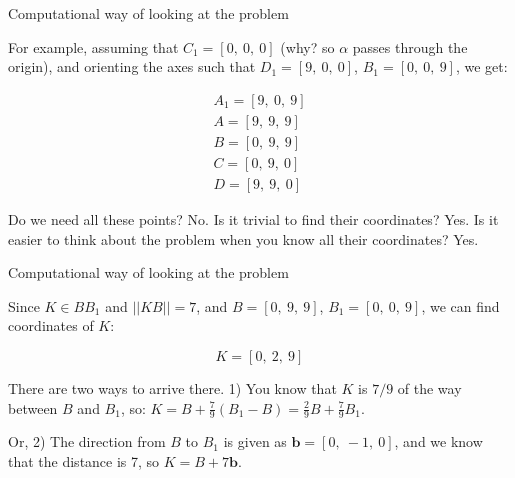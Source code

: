 \documentclass{beamer}
\begin{document}
\begin{frame}{Computational way of looking at the problem}
	\begin{flushleft}
		
		
		For example, assuming that $C_1 = [0, \ 0,  \ 0]$ (why? so $\alpha$ passes through the origin), and orienting the axes such that $D_1 = [9, \ 0,  \ 0]$, $B_1 = [0, \ 0,  \ 9]$, we get:
		
		\begin{align}
		A_1 = [9, \ 0,  \ 9] \\
		A = [9, \ 9,  \ 9] \\
		B = [0, \ 9,  \ 9] \\
		C = [0, \ 9,  \ 0] \\
		D = [9, \ 9,  \ 0]
		\end{align}
	
Do we need all these points? No. Is it trivial to find their coordinates? Yes. Is it easier to think about the problem when you know all their coordinates? Yes.	
		
	\end{flushleft}
\end{frame}



\begin{frame}{Computational way of looking at the problem}
	\begin{flushleft}
		
		Since  $K \in BB_1$ and $||KB|| = 7$, and $B = [0, \ 9,  \ 9]$, $B_1 = [0, \ 0,  \ 9]$, we can find coordinates of $K$:
		
		\begin{equation}
			K =  [0, \ 2,  \ 9]
		\end{equation}
		
		There are two ways to arrive there. 1) You know that $K$ is $7 / 9$ of the way between $B$ and $B_1$, so: $K = B + \frac{7}{9}(B_1-B) = \frac{2}{9}B + \frac{7}{9}B_1$. 
		
		\bigskip
		
		Or, 2) The direction from $B$ to $B_1$ is given as $\mathbf b = [0, \ -1,  \ 0]$, and we know that the distance is 7, so $K = B + 7\mathbf b$.
		
	\end{flushleft}
\end{frame}
\end{document}
